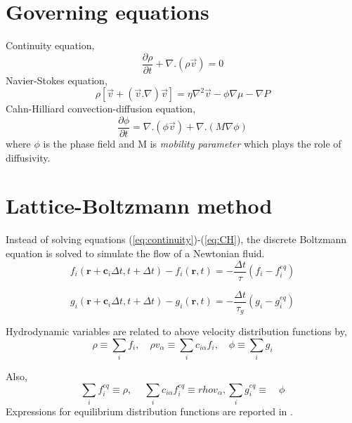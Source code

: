 \documentclass{article}
\begin{document}
\section{Governing equations}
Continuity equation,
\begin{equation}
	\frac{\partial \rho}{\partial t} + \nabla.(\rho \vec{v}) = 0
\label{eq:continuity}
\end{equation}
Navier-Stokes equation,
\begin{equation}
	\rho [\vec{v} + (\vec{v}.\nabla)\vec{v}] = \eta \nabla^2\vec{v}-\phi\nabla\mu - \nabla P
	\label{eq:NS}
\end{equation}
Cahn-Hilliard convection-diffusion equation,
\begin{equation}
	\frac{\partial \phi}{\partial t} = \nabla.(\phi \vec{v}) + \nabla.(M\nabla\phi)
 \label{eq:CH}
\end{equation}
where $\phi$ is the phase field and M is \textit{mobility parameter} which plays the role of diffusivity.

\section{Lattice-Boltzmann method}
Instead of solving equations (\ref{eq:continuity})-(\ref{eq:CH}), the discrete Boltzmann equation is solved to simulate the flow of a Newtonian fluid.
\begin{equation}
	f_{i}(\textbf{r}+\textbf{c}_{i}\Delta t, t+\Delta t) - f_{i}(\textbf{r},t) = -\frac{\Delta t}{\tau}(f_{i}-f_{i}^{eq})
	\label{eq:f}
\end{equation}

\begin{equation}
g_{i}(\textbf{r}+\textbf{c}_{i}\Delta t, t+\Delta t) - g_{i}(\textbf{r},t) = -\frac{\Delta t}{\tau_{g}}(g_{i}-g_{i}^{eq})
\label{eq:g}
\end{equation}

Hydrodynamic variables are related to above velocity distribution functions by,
\begin{equation}
	\rho \equiv \sum_{i} f_{i}, \quad \rho v_{\alpha} \equiv \sum_{i} c_{i\alpha} f_{i}, \quad \phi \equiv \sum_{i} g_{i}
	\label{eq:fg}
\end{equation}

Also, 
\begin{equation}
 \sum_{i} f_{i}^{eq} \equiv \rho, \quad \  \sum_{i} c_{i\alpha} f_{i}^{eq} \equiv rho v_{\alpha}, \sum_{i} g_{i}^{eq} \equiv \quad \phi 
\label{eq:fg}
\end{equation}
Expressions for equilibrium distribution functions are reported in \cite{paper:intertial_effects}.
\end{document}
